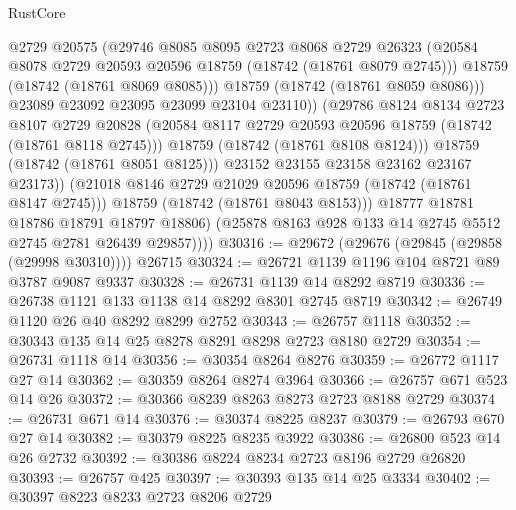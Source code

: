 \begin{lexlean}{RustCore}
\begin{coremodule}
                          @2729
                          @20575
                          (@29746
                            @8085
                            @8095
                            @2723
                            @8068
                            @2729
                            @26323
                            (@20584 @8078 @2729 @20593 @20596 @18759 (@18742 (@18761 @8079 @2745)))
                            @18759
                            (@18742 (@18761 @8069 @8085)))
                          @18759
                          (@18742 (@18761 @8059 @8086)))
                        @23089
                        @23092
                        @23095
                        @23099
                        @23104
                        @23110))
                    (@29786
                      @8124
                      @8134
                      @2723
                      @8107
                      @2729
                      @20828
                      (@20584 @8117 @2729 @20593 @20596 @18759 (@18742 (@18761 @8118 @2745)))
                      @18759
                      (@18742 (@18761 @8108 @8124)))
                    @18759
                    (@18742 (@18761 @8051 @8125)))
                  @23152
                  @23155
                  @23158
                  @23162
                  @23167
                  @23173))
              (@21018 @8146 @2729 @21029 @20596 @18759 (@18742 (@18761 @8147 @2745)))
              @18759
              (@18742 (@18761 @8043 @8153)))
            @18777
            @18781
            @18786
            @18791
            @18797
            @18806)
          (@25878 @8163 @928 @133 @14 @2745 @5512 @2745 @2781 @26439 @29857))))
@30316 := @29672 (@29676 (@29845 (@29858 (@29998 @30310)))) @26715
@30324 := @26721 @1139 @1196 @104 @8721 @89 @3787 @9087 @9337
@30328 := @26731 @1139 @14 @8292 @8719
@30336 := @26738 @1121 @133 @1138 @14 @8292 @8301 @2745 @8719
@30342 := @26749 @1120 @26 @40 @8292 @8299 @2752
@30343 := @26757 @1118
@30352 := @30343 @135 @14 @25 @8278 @8291 @8298 @2723 @8180 @2729
@30354 := @26731 @1118 @14
@30356 := @30354 @8264 @8276
@30359 := @26772 @1117 @27 @14
@30362 := @30359 @8264 @8274 @3964
@30366 := @26757 @671 @523 @14 @26
@30372 := @30366 @8239 @8263 @8273 @2723 @8188 @2729
@30374 := @26731 @671 @14
@30376 := @30374 @8225 @8237
@30379 := @26793 @670 @27 @14
@30382 := @30379 @8225 @8235 @3922
@30386 := @26800 @523 @14 @26 @2732
@30392 := @30386 @8224 @8234 @2723 @8196 @2729 @26820
@30393 := @26757 @425
@30397 := @30393 @135 @14 @25 @3334
@30402 := @30397 @8223 @8233 @2723 @8206 @2729

\end{coremodule}
\end{lexlean}
